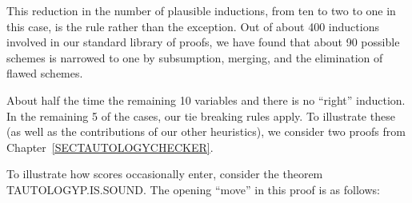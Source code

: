 \documentclass[11pt]{book}
\begin{document}
This  reduction in the number of plausible inductions, from ten
to two to one in this case, is the rule rather than the
exception.  Out of about 400 inductions involved in our standard library
of proofs, we have found that about 90%
possible schemes is narrowed to one by subsumption, merging,
and the elimination of flawed schemes.

About half the time the remaining 10%
variables and there is no ``right'' induction.  In the remaining 5%
of the cases, our tie breaking rules apply.  To illustrate these
(as well as the contributions of our other heuristics), we  consider
two proofs  from Chapter~\ref{SECTAUTOLOGYCHECKER}.

To illustrate how scores occasionally enter, consider the
theorem TAU\-TOL\-OGYP.IS.SOUND.
The opening ``move'' in this proof is as follows:
\end{document}
